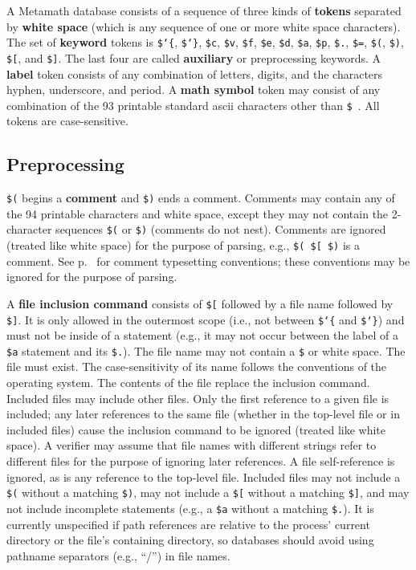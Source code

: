 A Metamath database consists of a sequence of three kinds of {\bf
tokens} separated by {\bf white space}
(which is any sequence of one or more white space characters).  The set
of {\bf keyword} tokens is \texttt{\$\char`\{},
\texttt{\$\char`\}}, \texttt{\$c}, \texttt{\$v}, \texttt{\$f},
\texttt{\$e}, \texttt{\$d}, \texttt{\$a}, \texttt{\$p}, \texttt{\$.},
\texttt{\$=}, \texttt{\$(}, \texttt{\$)}, \texttt{\$[}, and
\texttt{\$]}.  The last four are called {\bf auxiliary} or preprocessing keywords.  A {\bf label} token
consists of any combination of letters, digits, and the characters
hyphen, underscore, and period.  A {\bf math symbol}
token may consist of any combination of the 93 printable standard {\sc
ascii} characters other than \texttt{\$}~. All tokens are
case-sensitive.

\subsection{Preprocessing}

\texttt{\$(} begins a {\bf comment} and \texttt{\$)} ends a comment.  Comments may contain any of
the 94 printable characters and white space, except they may not contain the
2-character sequences \texttt{\$(} or \texttt{\$)} (comments do not nest).  Comments are ignored (treated
like white space) for the purpose of parsing, e.g.,
\texttt{\$( \$[ \$)} is a comment.
See p.~\pageref{mathcomments} for comment typesetting conventions; these
conventions may be ignored for the purpose of parsing.

A {\bf file inclusion command} consists of \texttt{\$[} followed by a file name
followed by \texttt{\$]}.
It is only allowed in the outermost scope (i.e., not between 
\texttt{\$\char`\{} and \texttt{\$\char`\}})
and must not be inside of a statement (e.g., it may not occur
between the label of a \texttt{\$a} statement and its \texttt{\$.}).
The file name may not
contain a \texttt{\$} or white space.  The file must exist.
The case-sensitivity
of its name follows the conventions of the operating system.  The contents of
the file replace the inclusion command.
Included files may include other files.
Only the first reference to a given file is included; any later
references to the same file (whether in the top-level file or in included
files) cause the inclusion command to be ignored (treated like white space).
A verifier may assume that file names with different strings
refer to different files for the purpose of ignoring later references.
A file self-reference is ignored, as is any reference to the top-level file.
Included files may not include a \texttt{\$(} without a matching \texttt{\$)},
may not include a \texttt{\$[} without a matching \texttt{\$]}, and may
not include incomplete statements (e.g., a \texttt{\$a} without a matching
\texttt{\$.}).
It is currently unspecified if path references are relative to the process'
current directory or the file's containing directory, so databases should
avoid using pathname separators (e.g., ``/'') in file names.


